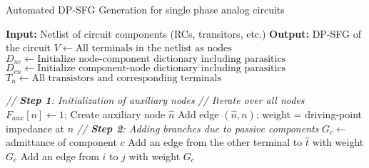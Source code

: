 
\small
\begin{algorithm*}[t]
\vspace{-0.5cm}
\caption{Automated DP-SFG Generation for single phase analog circuits}
\label{algo:dpsfg}
\begin{multicols}{2}
\begin{algorithmic}[1]
\State \textbf{Input:} Netlist of circuit components (RCs, transitors, etc.)
\State \textbf{Output:} DP-SFG of the circuit
\State $V \gets \text{All terminals in the netlist as nodes}$  \label{algo1:init_begin}
\State $D_{nc} \gets \text{Initialize node-component dictionary including parasitics}$
\State $D_{cn} \gets \text{Initialize component-node dictionary including parasitics}$
\State $T_{n} \gets \text{All transistors and corresponding terminals}$ \label{algo1:init_end}

\Statex \textit{// \textbf{Step 1}: Initialization of auxiliary nodes}
 \textit{// Iterate over all nodes} \label{algo1:step1_begin}
        \State $F_{aux}[n] \gets 1$; Create auxiliary node $\hat{n}$
        \State Add edge $(\hat{n}, n)$; weight = driving-point impedance at $n$
    \EndIf    
\EndFor \label{algo1:step1_end}
\Statex \textit{// \textbf{Step 2}: Adding branches due to passive components}
 \label{algo1:step2_begin}
    \State $G_c \gets$ admittance of component $c$ 
    \State Add an edge from the other terminal to $\hat{t}$ with weight $G_c$
    \Else
    \State Add an edge from $i$ to $j$ with weight $G_c$ 
    \EndIf

\end{algorithmic}
\end{multicols}
\end{algorithm*}
